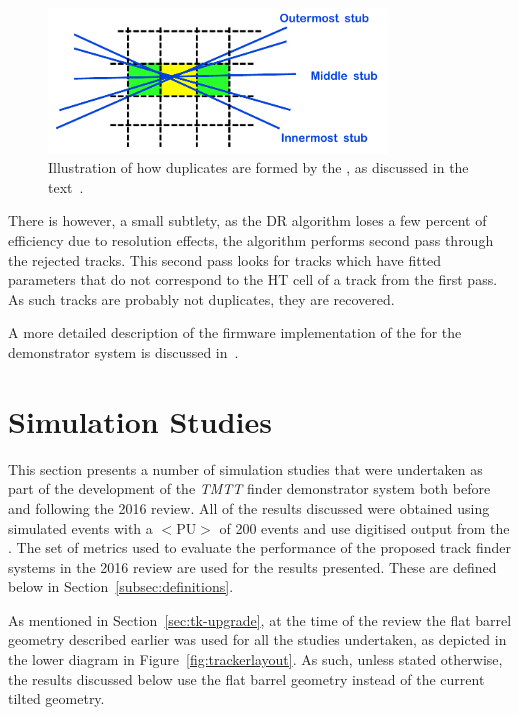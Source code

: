 \begin{figure}[!h]
\centering
\includegraphics[width=0.80\textwidth]{figs/tk-upgrade/A50_algo.pdf}
\caption{Illustration of how duplicates are formed by the \rphi \HT, as discussed in the text~\cite{TMTT_JINST}.}
\label{fig:DR}
\end{figure}

There is however, a small subtlety, as the DR algorithm loses a few percent of efficiency due to resolution effects, the algorithm performs second pass through the rejected tracks.
This second pass looks for tracks which have fitted parameters that do not correspond to the HT cell of a track from the first pass.
As such tracks are probably not duplicates, they are recovered.

A more detailed description of the firmware implementation of the \DR for the demonstrator system is discussed in~\cite{TMTT_JINST}.

\section{Simulation Studies}\label{sec:TmttSimStudies}
This section presents a number of simulation studies that were undertaken as part of the development of the \emph{TMTT} finder demonstrator system both before and following the 2016 review.
All of the results discussed were obtained using simulated \ttbar events with a $<\textrm{PU}>$ of 200 events and use digitised output from the \HT.
The set of metrics used to evaluate the performance of the proposed track finder systems in the 2016 review are used for the results presented.
These are defined below in Section~\ref{subsec:definitions}.

As mentioned in Section~\ref{sec:tk-upgrade}, at the time of the review the flat barrel geometry described earlier was used for all the studies undertaken, as depicted in the lower diagram in Figure~\ref{fig:trackerlayout}.
As such, unless stated otherwise, the results discussed below use the flat barrel geometry instead of the current tilted geometry.

